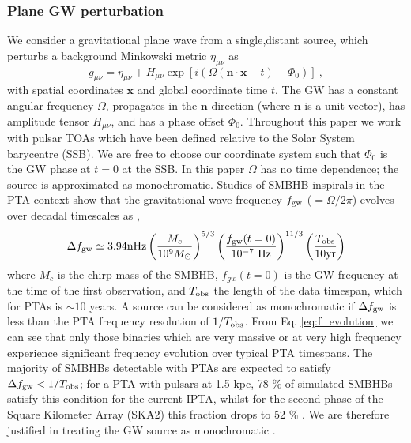\documentclass[fleqn,usenatbib,useAMS]{mnras}
\begin{document}
\subsubsection{Plane GW perturbation}
We consider a gravitational plane wave from a single,distant source, which perturbs a background Minkowski metric $\eta_{\mu \nu}$ as
\begin{equation}
	g_{\mu \nu} = \eta_{\mu \nu} + H_{\mu \nu} \exp{[i(\Omega(\boldsymbol{n} \cdot \boldsymbol{x} - t) + \Phi_0)]} \ ,
\end{equation}
with spatial coordinates $\boldsymbol{x}$ and global coordinate time $t$. The GW has a constant angular frequency $\Omega$, propagates in the $\boldsymbol{n}$-direction (where $\boldsymbol{n}$ is a unit vector), has amplitude tensor $H_{\mu \nu}$, and has a phase offset  $\Phi_0$. Throughout this paper we work with pulsar TOAs which have been defined relative to the Solar System barycentre (SSB). We are free to choose our coordinate system such that $\Phi_0$ is the GW phase at $t=0$ at the SSB. In this paper $\Omega$ has no time dependence; the source is approximated as monochromatic. Studies of SMBHB inspirals in the PTA context show that the gravitational wave frequency $f_{\rm gw}$ ($=\Omega / 2 \pi $) evolves over decadal timescales as \citep[e.g.][]{Zhu10},
\begin{equation}
	\Delta f_{\rm gw} \simeq 3.94 \mathrm{nHz}\left(\frac{M_c}{10^9 M_{\odot}}\right)^{5 / 3}\left(\frac{f_{\rm gw}(t=0)}{10^{-7} \mathrm{~Hz}}\right)^{11 / 3}\left(\frac{T_{\mathrm{obs}}}{10 \mathrm{yr}}\right)
	\label{eq:f_evolution}
\end{equation}
where $M_c$ is the chirp mass of the SMBHB, $f_{gw}(t=0)$ is the GW frequency at the time of the first observation, and $T_{\rm obs}$ the length of the data timespan, which for PTAs is $\sim 10$ years. A source can be considered as monochromatic if $\Delta f_{\rm gw}$ is less than the PTA frequency resolution of $1/T_{\rm obs}$. From Eq. \ref{eq:f_evolution} we can see that only those binaries which are very massive or at very high frequency experience significant frequency evolution over typical PTA timespans. The majority of SMBHBs detectable with PTAs are expected to satisfy $\Delta f_{\rm gw} < 1/T_{\rm obs}$; for a PTA with pulsars at 1.5 kpc, 78 \% of simulated SMBHBs satisfy this condition for the current IPTA, whilst for the second phase of the Square Kilometer Array (SKA2) this fraction drops to 52 \% \citep[Fig 7 of ][]{Rosado10.1093/mnras/stv1098}. We are therefore justified in treating the GW source as monochromatic \citep{Sesana10,Sesana2010,Ellis2012ApJ}. \newline 
\end{document}
